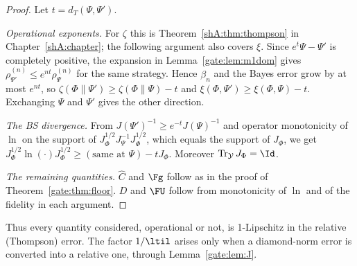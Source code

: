 \begin{proof}
Let $t=d_T(\Psi,\Psi')$.

\emph{Operational exponents.} For $\zeta$ this is Theorem~\ref{shA:thm:thompson} in Chapter~\ref{shA:chapter}; the following argument also covers $\xi$. Since $e^t\Psi-\Psi'$ is completely positive, the expansion in Lemma~\ref{gate:lem:m1dom} gives $\rho^{(n)}_{\Psi'}\le e^{nt}\rho^{(n)}_\Psi$ for the same strategy. Hence $\beta_n$ and the Bayes error grow by at most $e^{nt}$, so $\zeta(\Phi\|\Psi')\ge\zeta(\Phi\|\Psi)-t$ and $\xi(\Phi,\Psi')\ge\xi(\Phi,\Psi)-t$. Exchanging $\Psi$ and $\Psi'$ gives the other direction.

\emph{The BS divergence.} From $J(\Psi')^{-1}\ge e^{-t}J(\Psi)^{-1}$ and operator monotonicity of $\ln$ on the support of $J_\Phi^{1/2}J_\Psi^{-1}J_\Phi^{1/2}$, which equals the support of $J_\Phi$, we get $J_\Phi^{1/2}\ln(\cdot)J_\Phi^{1/2}\ge(\text{same at }\Psi)-tJ_\Phi$. Moreover $\Tr_{\mathcal Y}J_\Phi=\Id$.

\emph{The remaining quantities.} $\hat C$ and $\Fg$ follow as in the proof of Theorem~\ref{gate:thm:floor}. $D$ and $\FU$ follow from monotonicity of $\ln$ and of the fidelity in each argument.
\end{proof}

Thus every quantity considered, operational or not, is 1-Lipschitz in the relative (Thompson) error. The factor $1/\ltil$ arises only when a diamond-norm error is converted into a relative one, through Lemma~\ref{gate:lem:J}.

